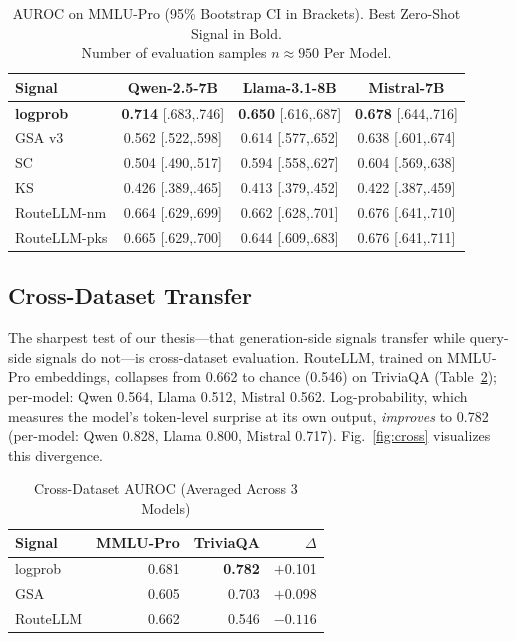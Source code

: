 \documentclass[journal]{IEEEtran}
\begin{document}
\begin{table}[t]
\centering
\caption{AUROC on MMLU-Pro (95\% Bootstrap CI in Brackets). Best Zero-Shot Signal in Bold. \\ Number of evaluation samples $n \approx 950$ Per Model.}
\label{tab:main}
\begin{tabular}{lccc}
\toprule
Signal & Qwen-2.5-7B & Llama-3.1-8B & Mistral-7B \\
\midrule
\textbf{logprob} & \textbf{0.714} {\scriptsize [.683,.746]} & \textbf{0.650} {\scriptsize [.616,.687]} & \textbf{0.678} {\scriptsize [.644,.716]} \\
GSA v3 & 0.562 {\scriptsize [.522,.598]} & 0.614 {\scriptsize [.577,.652]} & 0.638 {\scriptsize [.601,.674]} \\
SC & 0.504 {\scriptsize [.490,.517]} & 0.594 {\scriptsize [.558,.627]} & 0.604 {\scriptsize [.569,.638]} \\
KS & 0.426 {\scriptsize [.389,.465]} & 0.413 {\scriptsize [.379,.452]} & 0.422 {\scriptsize [.387,.459]} \\
\midrule
RouteLLM-nm & 0.664 {\scriptsize [.629,.699]} & 0.662 {\scriptsize [.628,.701]} & 0.676 {\scriptsize [.641,.710]} \\
RouteLLM-pks & 0.665 {\scriptsize [.629,.700]} & 0.644 {\scriptsize [.609,.683]} & 0.676 {\scriptsize [.641,.711]} \\
\bottomrule
\end{tabular}
\end{table}

\subsection{Cross-Dataset Transfer}
\label{sec:cross-dataset}

The sharpest test of our thesis---that generation-side signals transfer while query-side signals do not---is cross-dataset evaluation. RouteLLM, trained on MMLU-Pro embeddings, collapses from 0.662 to chance (0.546) on TriviaQA (Table~\ref{tab:cross}); per-model: Qwen 0.564, Llama 0.512, Mistral 0.562. Log-probability, which measures the model's token-level surprise at its own output, \emph{improves} to 0.782 (per-model: Qwen 0.828, Llama 0.800, Mistral 0.717). Fig.~\ref{fig:cross} visualizes this divergence.

\begin{table}[t]
\centering
\caption{Cross-Dataset AUROC (Averaged Across 3 Models)}
\label{tab:cross}
\begin{tabular}{lrrr}
\toprule
Signal & MMLU-Pro & TriviaQA & $\Delta$ \\
\midrule
logprob & 0.681 & \textbf{0.782} & $+$0.101 \\
GSA & 0.605 & 0.703 & $+$0.098 \\
RouteLLM & 0.662 & 0.546 & $\mathbf{-0.116}$ \\
\bottomrule
\end{tabular}
\end{table}
\end{document}
